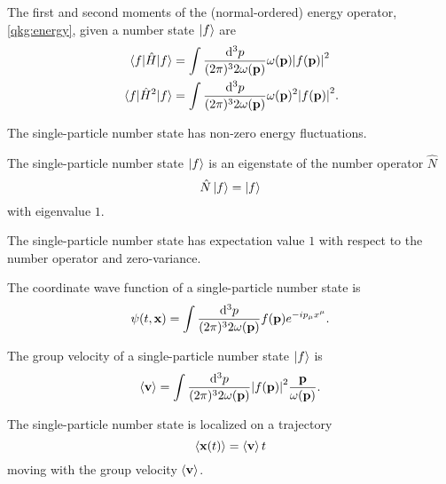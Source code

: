 \begin{theorem}\label{thm:single_particle_number_state_energy}
	The first and second moments of the (normal-ordered) energy operator, \cref{qkg:energy}, given a number state $\ket{f}$ are
	\begin{align}
		\expval{\hat{H}}{f}
		&=
		\int\frac{\dd[3]{p}}{(2\pi)^32\omega(\vb{p})}
		\omega(\vb{p})
		\abs{f(\vb{p})}^2
		\\
		\expval{\hat{H}^2}{f}
		&=
		\int\frac{\dd[3]{p}}{(2\pi)^32\omega(\vb{p})}
		\omega(\vb{p})^2
		\abs{f(\vb{p})}^2
		\label{eq:single_particle_number_state_energy}
		.
	\end{align}
\end{theorem}
\begin{corollary}
	The single-particle number state has non-zero energy fluctuations.
\end{corollary}
\begin{theorem}\label{thm:single_particle_number_state_number_eigenstate}
	The single-particle number state $\ket{f}$ is an eigenstate of the number operator $\hat{N}$
	\begin{equation}
		\hat{N}
		\ket{f}
		=
		\ket{f}
	\end{equation}
	with eigenvalue $1$.
\end{theorem}
\begin{corollary}
	The single-particle number state has expectation value $1$ with respect to the number operator and zero-variance.
\end{corollary}
\begin{lemma}\label{thm:single_particle_number_state_wave_function}
	The coordinate wave function of a single-particle number state is
	\begin{equation}
		\psi(t,\vb{x})
		=
		\int\frac{\dd[3]{p}}{(2\pi)^32\omega(\vb{p})}
		f(\vb{p})e^{-ip_\mu x^\mu}
		.
	\end{equation}
\end{lemma}
\begin{lemma}\label{thm:single_particle_number_state_group_velocity}
	The group velocity of a single-particle number state $\ket{f}$ is
	\begin{equation}
		\expval{\vb{v}}
		=
		\int\frac{\dd[3]{p}}{(2\pi)^32\omega(\vb{p})}
		\abs{f(\vb{p})}^2
		\frac{\vb{p}}{\omega(\vb{p})}
		\label{eq:single_particle_number_state_group_velocity}
		.
	\end{equation}
\end{lemma}
\begin{lemma}
	The single-particle number state is localized on a trajectory
	\begin{equation}
		\expval{\vb{x}(t)}
		=
		\expval{\vb{v}}t
	\end{equation}
	moving with the group velocity $\expval{\vb{v}}$.
\end{lemma}


